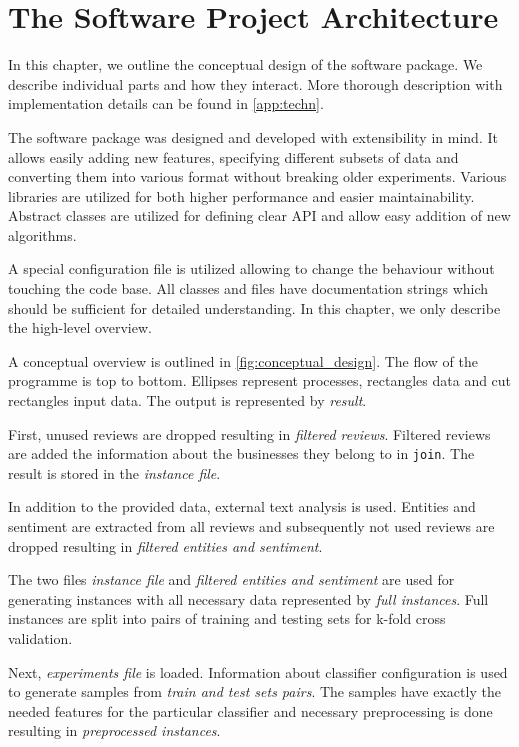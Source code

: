 \chapter{The Software Project Architecture}\label{chap:arch}

In this chapter, we outline the conceptual design of the software package.
We describe individual parts and how they interact.
More thorough description with implementation details can be found in \autoref{app:techn}.


The software package was designed and developed with extensibility in mind.
It allows easily adding new features, specifying different subsets of data and converting them into various format without breaking older experiments.
Various libraries are utilized for both higher performance and easier maintainability.
Abstract classes are utilized for defining clear API and allow easy addition of new algorithms.

A special configuration file is utilized allowing to change the behaviour without touching the code base.
All classes and files have documentation strings which should be sufficient for detailed understanding.
In this chapter, we only describe the high-level overview.

A conceptual overview is outlined in \autoref{fig:conceptual_design}.
The flow of the programme is top to bottom.
Ellipses represent processes, rectangles data and cut rectangles input data.
The output is represented by \textit{result}.

First, unused reviews are dropped resulting in \textit{filtered reviews}.
Filtered reviews are added the information about the businesses they belong to in \texttt{join}.
The result is stored in the \textit{instance file}.

In addition to the provided data, external text analysis is used.
Entities and sentiment are extracted from all reviews and
subsequently not used reviews are dropped resulting in \textit{filtered entities and sentiment}.

The two files \textit{instance file} and \textit{filtered entities and sentiment} 
are used for generating instances with all necessary data represented by \textit{full instances}.
Full instances are split into pairs of training and testing sets for k-fold cross validation.

Next, \textit{experiments file} is loaded.
Information about classifier configuration is used to generate samples from \textit{train and test sets pairs}.
The samples have exactly the needed features for the particular classifier and necessary preprocessing is done
resulting in \textit{preprocessed instances}.

